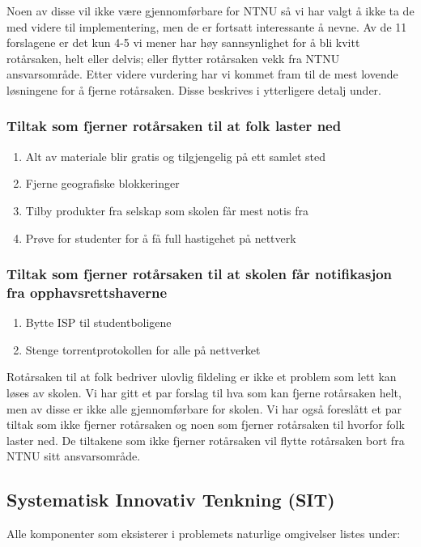 Noen av disse vil ikke være gjennomførbare for NTNU så vi har valgt å ikke ta de med videre til implementering, men de er fortsatt interessante å nevne. Av de 11 forslagene er det kun 4-5 vi mener har høy sannsynlighet for å bli kvitt rotårsaken, helt eller delvis; eller flytter rotårsaken vekk fra NTNU ansvarsområde. Etter videre vurdering har vi kommet fram til de mest lovende løsningene for å fjerne rotårsaken. Disse beskrives i ytterligere detalj under.

\subsubsection{Tiltak som fjerner rotårsaken til at folk laster ned}

\begin{enumerate}
    \item Alt av materiale blir gratis og tilgjengelig på ett samlet sted
    \item Fjerne geografiske blokkeringer
    \item Tilby produkter fra selskap som skolen får mest notis fra
    \item Prøve for studenter for å få full hastigehet på nettverk
\end{enumerate}

\subsubsection{Tiltak som fjerner rotårsaken til at skolen får notifikasjon fra opphavsrettshaverne}

\begin{enumerate}
    \item Bytte ISP til studentboligene
    \item Stenge torrentprotokollen for alle på nettverket
\end{enumerate}

Rotårsaken til at folk bedriver ulovlig fildeling er ikke et problem som lett kan løses av skolen. Vi har gitt et par forslag til hva som kan fjerne rotårsaken helt, men av disse er ikke alle gjennomførbare for skolen. Vi har også foreslått et par tiltak som ikke fjerner rotårsaken og noen som fjerner rotårsaken til hvorfor folk laster ned. De tiltakene som ikke fjerner rotårsaken vil flytte rotårsaken bort fra NTNU sitt ansvarsområde.

\subsection{Systematisk Innovativ Tenkning (SIT)}
Alle komponenter som eksisterer i problemets naturlige omgivelser listes under:

